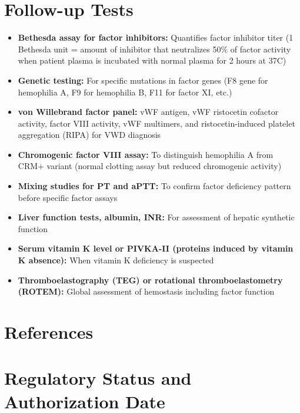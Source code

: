 \section*{Follow-up Tests}
\begin{itemize}
  \item \textbf{Bethesda assay for factor inhibitors:} Quantifies factor inhibitor titer (1 Bethesda unit = amount of inhibitor that neutralizes 50\% of factor activity when patient plasma is incubated with normal plasma for 2 hours at 37\textdegree{}C)
  \item \textbf{Genetic testing:} For specific mutations in factor genes (F8 gene for hemophilia A, F9 for hemophilia B, F11 for factor XI, etc.)
  \item \textbf{von Willebrand factor panel:} vWF antigen, vWF ristocetin cofactor activity, factor VIII activity, vWF multimers, and ristocetin-induced platelet aggregation (RIPA) for VWD diagnosis
  \item \textbf{Chromogenic factor VIII assay:} To distinguish hemophilia A from CRM+ variant (normal clotting assay but reduced chromogenic activity)
  \item \textbf{Mixing studies for PT and aPTT:} To confirm factor deficiency pattern before specific factor assays
  \item \textbf{Liver function tests, albumin, INR:} For assessment of hepatic synthetic function
  \item \textbf{Serum vitamin K level or PIVKA-II (proteins induced by vitamin K absence):} When vitamin K deficiency is suspected
  \item \textbf{Thromboelastography (TEG) or rotational thromboelastometry (ROTEM):} Global assessment of hemostasis including factor function
\end{itemize}

\section*{References}



\clearpage
\section*{Regulatory Status and Authorization Date}

\clearpage
